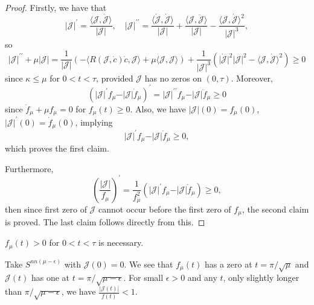 \begin{proof}
	Firstly, we have that
	\[
		\vert \mathcal{J}  \vert ^{\prime} = \frac{\langle \mathcal{J} , \dot{\mathcal{J} }  \rangle }{\vert \mathcal{J}  \vert },\quad
		\vert \mathcal{J}  \vert ^{\prime\prime} = \frac{\langle \dot{\mathcal{J} } , \dot{\mathcal{J} } \rangle }{\vert \mathcal{J}  \vert } + \frac{\langle \mathcal{J} , \ddot{\mathcal{J} }  \rangle }{\vert \mathcal{J}  \vert } - \frac{\langle \mathcal{J} , \dot{\mathcal{J} }  \rangle ^2}{\vert \mathcal{J} \vert^3 },
	\]
	so
	\[
		\vert \mathcal{J}  \vert ^{\prime\prime} + \mu \vert \mathcal{J} \vert
		= \frac{1}{\vert \mathcal{J} \vert } \left( - \langle R(\mathcal{J} , \dot{c} ) \dot{c}, \mathcal{J} \rangle + \mu \langle \mathcal{J} , \mathcal{J}  \rangle  \right) + \frac{1}{\vert \mathcal{J}  \vert ^3} \left( \vert \dot{\mathcal{J} } \vert^2 \vert \mathcal{J}  \vert ^2 - \langle \mathcal{J} , \dot{\mathcal{J} } \rangle ^2 \right) \geq 0
	\]
	since \(\kappa \leq \mu \) for \(0 < t < \tau \), provided \(\mathcal{J} \) has no zeros on \((0, \tau )\). Moreover,
	\[
		\left( \vert \mathcal{J}  \vert ^{\prime} f_\mu - \vert \mathcal{J}  \vert \dot{f} _\mu  \right) ^{\prime}
		= \vert \mathcal{J}  \vert ^{\prime\prime} f_\mu - \vert \mathcal{J}  \vert \ddot{f}_\mu \geq 0
	\]
	since \(\ddot{f}_\mu + \mu f_\mu = 0\) for \(f_\mu (t) \geq 0\). Also, we have \(\vert \mathcal{J}  \vert (0) = f_\mu (0)\), \(\vert \mathcal{J}  \vert ^{\prime} (0) = \dot{f} _\mu (0)\), implying
	\[
		\vert \mathcal{J}  \vert ^{\prime} f_\mu - \vert \mathcal{J}  \vert \dot{f} _\mu \geq 0,
	\]
	which proves the first claim.

	Furthermore,
	\[
		\left( \frac{\vert \mathcal{J}  \vert }{f_\mu } \right) ^{\prime} = \frac{1}{f^2_\mu } \left( \vert \mathcal{J}  \vert ^{\prime} f_\mu - \vert \mathcal{J}  \vert \dot{f} _\mu  \right) \geq 0,
	\]
	then since first zero of \(\mathcal{J}\) cannot occur before the first zero of \(f_\mu \), the second claim is proved. The last claim follows directly from this.
\end{proof}

\begin{remark}
	\(f_\mu (t) > 0\) for \(0 < t < \tau \) is necessary.
\end{remark}
\begin{explanation}
	Take \(S^{nn(\mu - \epsilon )} \) with \(\mathcal{J} (0) = 0\). We see that \(f_\mu (t)\) has a zero at \(t = \pi / \sqrt{\mu } \) and \(\mathcal{J} (t)\) has one at \(t = \pi / \sqrt{\mu - \epsilon } \). For small \(\epsilon > 0\) and any \(t\), only slightly longer than \(\pi / \sqrt{\mu - \epsilon } \), we have \(\frac{\vert \mathcal{J} (t) \vert }{f(t)} < 1\).
\end{explanation}

